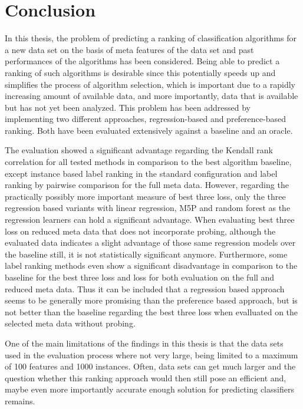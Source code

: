 \chapter{Conclusion}
\label{sec:conclusion}
In this thesis, the problem of predicting a ranking of classification algorithms for a new data set on the basis of meta features of the data set and past performances of the algorithms has been considered. Being able to predict a ranking of such algorithms is desirable since this potentially speeds up and simplifies the process of algorithm selection, which is important due to a rapidly increasing amount of available data, and more importantly, data that is available but has not yet been analyzed. This problem has been addressed by implementing two different approaches, regression-based and preference-based ranking. Both have been evaluated extensively against a baseline and an oracle.

The evaluation showed a significant advantage regarding the Kendall rank correlation for all tested methods in comparison to the best algorithm baseline, except instance based label ranking in the standard configuration and label ranking by pairwise comparison for the full meta data. However, regarding the practically possibly more important measure of best three loss, only the three regression based variants with linear regression, M5P and random forest as the regression learners can hold a significant advantage. When evaluating best three loss on reduced meta data that does not incorporate probing, although the evaluated data indicates a slight advantage of those same regression models over the baseline still, it is not statistically significant anymore. Furthermore, some label ranking methods even show a significant disadvantage in comparison to the baseline for the best three loss and loss for both evaluation on the full and reduced meta data. Thus it can be included that a regression based approach seems to be generally more promising than the preference based approach, but is not better than the baseline regarding the best three loss when evalluated on the selected meta data without probing. 

One of the main limitations of the findings in this thesis is that the data sets used in the evaluation process where not very large, being limited to a maximum of 100 features and 1000 instances. Often, data sets can get much larger and the question whether this ranking approach would then still pose an efficient and, maybe even more importantly accurate enough solution for predicting classifiers remains. 

